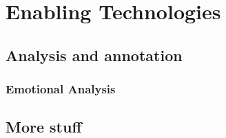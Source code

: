 \chapter{Enabling Technologies}
\label{chap:enabling_technologies}

\section{Analysis and annotation}
\subsection{Emotional Analysis}
\label{sec:emotional-analysis-senpy}

\section{More stuff}
